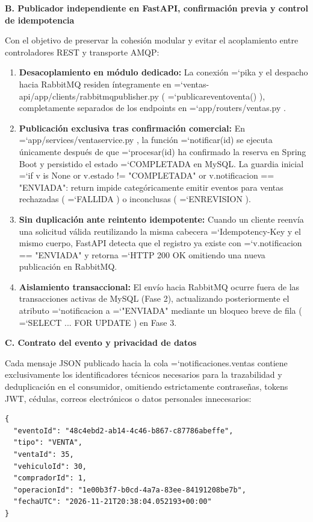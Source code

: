 \documentclass[11pt,a4paper]{article}
\renewcommand{\_}{\oldunderscore\allowbreak}
\DeclareRobustCommand{\texttt}[1]{%
  {\upshape\ttfamily\fontsize{9}{10.8}\selectfont\hyphenchar\font=`\-\relax #1}%
}
\begin{document}
\vspace{0.2cm}
\noindent\textbf{B. Publicador independiente en FastAPI, confirmación previa y control de idempotencia}

\noindent Con el objetivo de preservar la cohesión modular y evitar el acoplamiento entre controladores REST y transporte AMQP:
\begin{enumerate}[leftmargin=*,itemsep=2pt,topsep=1pt]
  \item \textbf{Desacoplamiento en módulo dedicado:} La conexión \texttt{pika} y el despacho hacia RabbitMQ residen íntegramente en \texttt{ventas-api/\allowbreak{}app/\allowbreak{}clients/\allowbreak{}rabbitmq\_publisher.\allowbreak{}py} (\texttt{publicar\_evento\_venta()}), completamente separados de los endpoints en \texttt{app/\allowbreak{}routers/\allowbreak{}ventas.\allowbreak{}py}.
  \item \textbf{Publicación exclusiva tras confirmación comercial:} En \texttt{app/\allowbreak{}services/\allowbreak{}venta\_service.\allowbreak{}py}, la función \texttt{notificar(id)} se ejecuta únicamente después de que \texttt{procesar(id)} ha confirmado la reserva en Spring Boot y persistido el estado \texttt{COMPLETADA} en MySQL. La guardia inicial \texttt{if v is None or v.\allowbreak{}estado != "COMPLETADA" or v.\allowbreak{}notificacion =\allowbreak{}= "ENVIADA": return} impide categóricamente emitir eventos para ventas rechazadas (\texttt{FALLIDA}) o inconclusas (\texttt{EN\_REVISION}).
  \item \textbf{Sin duplicación ante reintento idempotente:} Cuando un cliente reenvía una solicitud válida reutilizando la misma cabecera \texttt{Idempotency-Key} y el mismo cuerpo, FastAPI detecta que el registro ya existe con \texttt{v.\allowbreak{}notificacion =\allowbreak{}= "ENVIADA"} y retorna \texttt{HTTP 200 OK} omitiendo una nueva publicación en RabbitMQ.
  \item \textbf{Aislamiento transaccional:} El envío hacia RabbitMQ ocurre fuera de las transacciones activas de MySQL (Fase 2), actualizando posteriormente el atributo \texttt{notificacion} a \texttt{"ENVIADA"} mediante un bloqueo breve de fila (\texttt{SELECT ... FOR UPDATE}) en Fase 3.
\end{enumerate}

\vspace{0.2cm}
\noindent\textbf{C. Contrato del evento y privacidad de datos}

\noindent Cada mensaje JSON publicado hacia la cola \texttt{notificaciones.\allowbreak{}ventas} contiene exclusivamente los identificadores técnicos necesarios para la trazabilidad y deduplicación en el consumidor, omitiendo estrictamente contraseñas, tokens JWT, cédulas, correos electrónicos o datos personales innecesarios:
\begin{lstlisting}
{
  "eventoId": "48c4ebd2-ab14-4c46-b867-c87786abeffe",
  "tipo": "VENTA",
  "ventaId": 35,
  "vehiculoId": 30,
  "compradorId": 1,
  "operacionId": "1e00b3f7-b0cd-4a7a-83ee-84191208be7b",
  "fechaUTC": "2026-11-21T20:38:04.052193+00:00"
}
\end{lstlisting}
\end{document}
